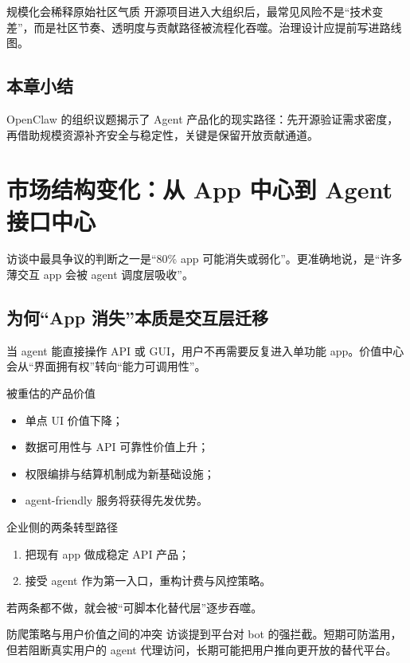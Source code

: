 \documentclass[a4paper]{article}
\begin{document}
\begin{warningbox}{规模化会稀释原始社区气质}
开源项目进入大组织后，最常见风险不是“技术变差”，而是社区节奏、透明度与贡献路径被流程化吞噬。治理设计应提前写进路线图。
\end{warningbox}

\subsection{本章小结}
OpenClaw 的组织议题揭示了 Agent 产品化的现实路径：先开源验证需求密度，再借助规模资源补齐安全与稳定性，关键是保留开放贡献通道。

\section{市场结构变化：从 App 中心到 Agent 接口中心}

访谈中最具争议的判断之一是“80\% app 可能消失或弱化”。更准确地说，是“许多薄交互 app 会被 agent 调度层吸收”。

\subsection{为何“App 消失”本质是交互层迁移}

当 agent 能直接操作 API 或 GUI，用户不再需要反复进入单功能 app。价值中心会从“界面拥有权”转向“能力可调用性”。

\begin{importantbox}{被重估的产品价值}
\begin{itemize}
    \item 单点 UI 价值下降；
    \item 数据可用性与 API 可靠性价值上升；
    \item 权限编排与结算机制成为新基础设施；
    \item agent-friendly 服务将获得先发优势。
\end{itemize}
\end{importantbox}

\begin{knowledgebox}{企业侧的两条转型路径}
\begin{enumerate}
    \item 把现有 app 做成稳定 API 产品；
    \item 接受 agent 作为第一入口，重构计费与风控策略。
\end{enumerate}
若两条都不做，就会被“可脚本化替代层”逐步吞噬。
\end{knowledgebox}

\begin{warningbox}{防爬策略与用户价值之间的冲突}
访谈提到平台对 bot 的强拦截。短期可防滥用，但若阻断真实用户的 agent 代理访问，长期可能把用户推向更开放的替代平台。
\end{warningbox}
\end{document}
